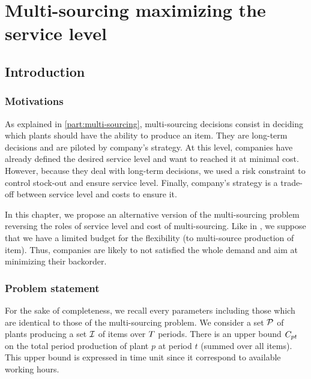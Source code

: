 \chapter{Multi-sourcing maximizing the service level}



\section{Introduction}


\subsection{Motivations}


As explained in \cref{part:multi-sourcing}, multi-sourcing decisions consist in deciding which plants should have the ability to produce an item.
They are long-term decisions and are piloted by company's strategy.
At this level, companies have already defined the desired service level and want to reached it at minimal cost.
However, because they deal with long-term decisions, we used a risk constraint to control stock-out and ensure service level.
Finally, company's strategy is a trade-off between service level and costs to ensure it.


In this chapter, we propose an alternative version of the multi-sourcing problem reversing the roles of service level and cost of multi-sourcing.
Like in \cite{}, we suppose that we have a limited budget for the flexibility (\ie to multi-source production of item).
Thus, companies are likely to not satisfied the whole demand and aim at minimizing their backorder.



\subsection{Problem statement}


For the sake of completeness, we recall every parameters including those which are identical to those of the multi-sourcing problem.
We consider a set $\mathcal{P}$ of plants producing a set $\mathcal{I}$ of items over $T$ periods.
There is an upper bound $C_{pt}$ on the total period production of plant $p$ at period $t$ (summed over all items).
This upper bound is expressed in time unit since it correspond to available working hours.


